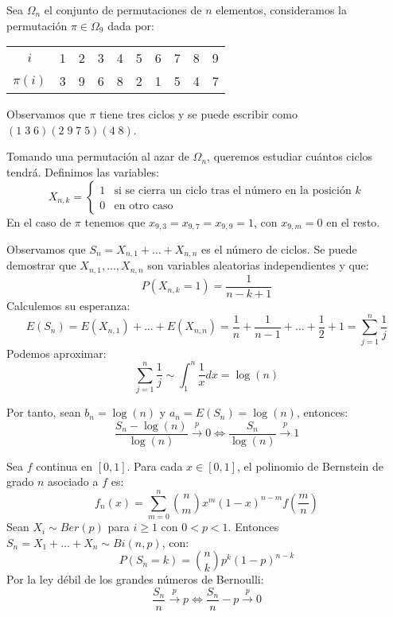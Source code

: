 \begin{example}
    Sea $\Omega_n$ el conjunto de permutaciones de $n$ elementos, consideramos la permutación $\pi \in \Omega_9$ dada por:
    \begin{center}
        \begin{tabular}{ c | c c c c c c c c c}
            $i$      & 1 & 2 & 3 & 4 & 5 & 6 & 7 & 8 & 9 \\
            $\pi(i)$ & 3 & 9 & 6 & 8 & 2 & 1 & 5 & 4 & 7
        \end{tabular}
    \end{center}
    Observamos que $\pi$ tiene tres ciclos y se puede escribir como $(1 \; 3 \; 6)(2 \; 9 \; 7 \; 5)(4 \; 8)$.

    Tomando una permutación al azar de $\Omega_n$, queremos estudiar cuántos ciclos tendrá.
    Definimos las variables:
    $$X_{n, k} = \begin{cases}
            1 & \text{si se cierra un ciclo tras el número en la posición } k \\
            0 & \text{en otro caso}
        \end{cases}$$
    En el caso de $\pi$ tenemos que $x_{9, 3} = x_{9, 7} = x_{9, 9} = 1$, con $x_{9, m} = 0$ en el resto.

    Observamos que $S_n = X_{n, 1} + \dots + X_{n, n}$ es el número de ciclos.
    Se puede demostrar que $X_{n, 1}, \dots, X_{n, n}$ son variables aleatorias independientes y que:
    $$P(X_{n, k} = 1) = \frac{1}{n-k+1}$$
    Calculemos su esperanza:
    $$E(S_n) = E(X_{n, 1}) + \dots + E(X_{n, n}) = \frac{1}{n} + \frac{1}{n-1} + \dots + \frac{1}{2} + 1 = \sum_{j=1}^n \frac{1}{j}$$
    Podemos aproximar:
    $$\sum_{j=1}^n \frac{1}{j} \sim \int_1^n \frac{1}{x}dx = \log(n)$$

    Por tanto, sean $b_n = \log(n)$ y $a_n = E(S_n) = \log(n)$, entonces:
    $$\frac{S_n - \log(n)}{\log(n)} \xrightarrow{p} 0 \Leftrightarrow \frac{S_n}{\log(n)} \xrightarrow{p} 1$$
\end{example}

\begin{example}
    Sea $f$ continua en $[0, 1]$.
    Para cada $x \in [0, 1]$, el polinomio de Bernstein de grado $n$ asociado a $f$ es:
    $$f_n(x) = \sum_{m=0}^n \binom{n}{m}x^m(1-x)^{n-m}f\left(\frac{m}{n}\right)$$
    Sean $X_i \sim Ber(p)$ para $i \geq 1$ con $0 < p < 1$.
    Entonces $S_n = X_1 + \dots + X_n \sim Bi(n, p)$, con:
    $$P(S_n = k) = \binom{n}{k}p^k(1-p)^{n-k}$$
    Por la ley débil de los grandes números de Bernoulli:
    $$\frac{S_n}{n} \xrightarrow{p} p \Leftrightarrow \frac{S_n}{n} - p \xrightarrow{p} 0$$
\end{example}

